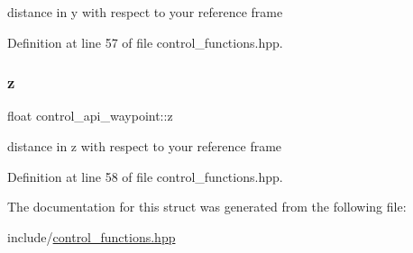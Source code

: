 distance in y with respect to your reference frame 



Definition at line 57 of file control\+\_\+functions.\+hpp.

\mbox{\label{structcontrol__api__waypoint_af77b8d62f18d1b4c1884b46147751b49}} 
\subsubsection{\texorpdfstring{z}{z}}
{\footnotesize\ttfamily float control\+\_\+api\+\_\+waypoint\+::z}



distance in z with respect to your reference frame 



Definition at line 58 of file control\+\_\+functions.\+hpp.



The documentation for this struct was generated from the following file\+:\begin{DoxyCompactItemize}
\item 
include/\mbox{\hyperlink{control__functions_8hpp}{control\+\_\+functions.\+hpp}}\end{DoxyCompactItemize}
